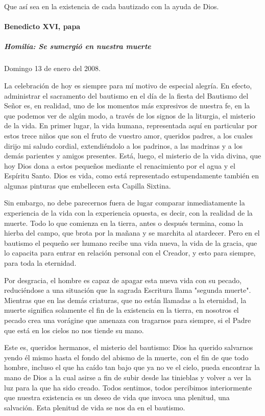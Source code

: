 \documentclass[]{article}
\let\oldparagraph\paragraph
\renewcommand{\paragraph}[1]{\oldparagraph{#1}\mbox{}}
\let\oldsubparagraph\subparagraph
\renewcommand{\subparagraph}[1]{\oldsubparagraph{#1}\mbox{}}
\begin{document}
Que así sea en la existencia de cada bautizado con la ayuda de Dios.

\paragraph{Benedicto XVI, papa}\label{benedicto-xvi-papa-10}

\subparagraph{Homilía: Se sumergió en nuestra
muerte}\label{homiluxeda-se-sumergiuxf3-en-nuestra-muerte}

Domingo 13 de enero del 2008.

La celebración de hoy es siempre para mí motivo de especial alegría. En
efecto, administrar el sacramento del bautismo en el día de la fiesta
del Bautismo del Señor es, en realidad, uno de los momentos más
expresivos de nuestra fe, en la que podemos ver de algún modo, a través
de los signos de la liturgia, el misterio de la vida. En primer lugar,
la vida humana, representada aquí en particular por estos trece niños
que son el fruto de vuestro amor, queridos padres, a los cuales dirijo
mi saludo cordial, extendiéndolo a los padrinos, a las madrinas y a los
demás parientes y amigos presentes. Está, luego, el misterio de la vida
divina, que hoy Dios dona a estos pequeños mediante el renacimiento por
el agua y el Espíritu Santo. Dios es vida, como está representado
estupendamente también en algunas pinturas que embellecen esta Capilla
Sixtina.

Sin embargo, no debe parecernos fuera de lugar comparar inmediatamente
la experiencia de la vida con la experiencia opuesta, es decir, con la
realidad de la muerte. Todo lo que comienza en la tierra, antes o
después termina, como la hierba del campo, que brota por la mañana y se
marchita al atardecer. Pero en el bautismo el pequeño ser humano recibe
una vida nueva, la vida de la gracia, que lo capacita para entrar en
relación personal con el Creador, y esto para siempre, para toda la
eternidad.

Por desgracia, el hombre es capaz de apagar esta nueva vida con su
pecado, reduciéndose a una situación que la sagrada Escritura llama
"segunda muerte". Mientras que en las demás criaturas, que no están
llamadas a la eternidad, la muerte significa solamente el fin de la
existencia en la tierra, en nosotros el pecado crea una vorágine que
amenaza con tragarnos para siempre, si el Padre que está en los cielos
no nos tiende su mano.

Este es, queridos hermanos, el misterio del bautismo: Dios ha querido
salvarnos yendo él mismo hasta el fondo del abismo de la muerte, con el
fin de que todo hombre, incluso el que ha caído tan bajo que ya no ve el
cielo, pueda encontrar la mano de Dios a la cual asirse a fin de subir
desde las tinieblas y volver a ver la luz para la que ha sido creado.
Todos sentimos, todos percibimos interiormente que nuestra existencia es
un deseo de vida que invoca una plenitud, una salvación. Esta plenitud
de vida se nos da en el bautismo.
\end{document}
